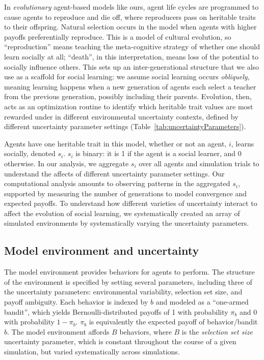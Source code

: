 \documentclass[letterpaper,11.5pt]{scrartcl}
\begin{document}
In \emph{evolutionary} agent-based models like ours, agent life cycles are
programmed to cause agents to reproduce and die off, where reproducers pass on
heritable traits to their offspring. 
Natural selection occurs in the model when agents with higher
payoffs preferentially reproduce. This is a model of cultural evolution, so
``reproduction'' means teaching the meta-cognitive strategy of whether one should learn
socially at all; ``death'', in this interpretation, means
loss of the potential to socially influence others. 
This sets up an inter-generational structure
that we also use as a scaffold for social learning: we assume social learning occurs
\emph{obliquely}, meaning learning happens when a new
generation of agents each select a teacher from the previous generation, possibly
including their parents.  
Evolution, then, acts as an optimization routine to identify which heritable trait
values are most rewarded under in different environmental uncertainty contexts,
defined by different uncertainty parameter settings
(Table~\ref{tab:uncertaintyParameters}).  

Agents have one heritable trait in this model, whether or not
an agent, $i$, learns socially, denoted $s_i$. $s_i$ is binary: it is 1
if the agent is a social learner, and 0 otherwise. In our analysis, we 
aggregate $s_i$ over all agents and simulation trials to understand the affects of
different uncertainty parameter settings. 
Our computational analysis amounts to observing patterns in
the aggregated $s_i$, supported by measuring the number of generations 
to model convergence and expected payoffs. 
To understand how different varieties of uncertainty interact
to affect the evolution of social learning, we systematically created an array of
simulated environments by systematically varying the uncertainty parameters. 


\subsection{Model environment and uncertainty}

The model environment provides behaviors for agents to perform. The structure
of the environment is specified by setting several parameters, including
three of the uncertainty parameters: environmental variability, selection set size, 
and payoff ambiguity. 
Each behavior is indexed by $b$ and modeled as a ``one-armed bandit'', which yields 
Bernoulli-distributed payoffs of 1 with probability $\pi_b$ and 0 with 
probability $1 - \pi_b$. $\pi_b$ is equivalently the expected
payoff of behavior/bandit $b$. The model environment affords $B$ behaviors, where
$B$ is the \emph{selection set size} uncertainty parameter, which
is constant throughout the course of a given simulation, but varied systematically
across simulations. 
\end{document}
